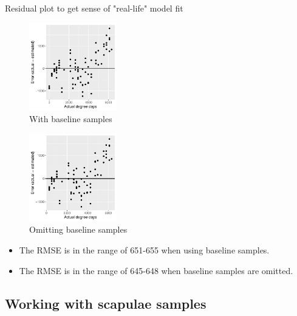 \documentclass{beamer}
\begin{document}
\begin{frame}{Residual plot to get sense of "real-life" model fit}

  \begin{minipage}{0.47\textwidth}
  \begin{figure}
      \includegraphics[width=1.5in]{RiceRivers/bacteria/use_families/w_ribs/w_baseline/leave_out_one_rib_and_one_day_residuals}
      \caption{With baseline samples}
  \end{figure}
  \end{minipage}  
  \begin{minipage}{0.47\textwidth}
  \begin{figure}
      \includegraphics[width=1.5in]{RiceRivers/bacteria/use_families/w_ribs/no_baseline/leave_out_one_rib_and_one_day_residuals}
      \caption{Omitting baseline samples}
  \end{figure}
  \end{minipage}
    \vspace{0.1in}
{\scriptsize
  \begin{itemize}
  \item The RMSE is in the range of 651-655 when using baseline samples.
  \item The RMSE is in the range of 645-648 when baseline samples are omitted.
  \end{itemize}
}

\end{frame}



\subsection[Scapulae]{Working with scapulae samples}
\end{document}
